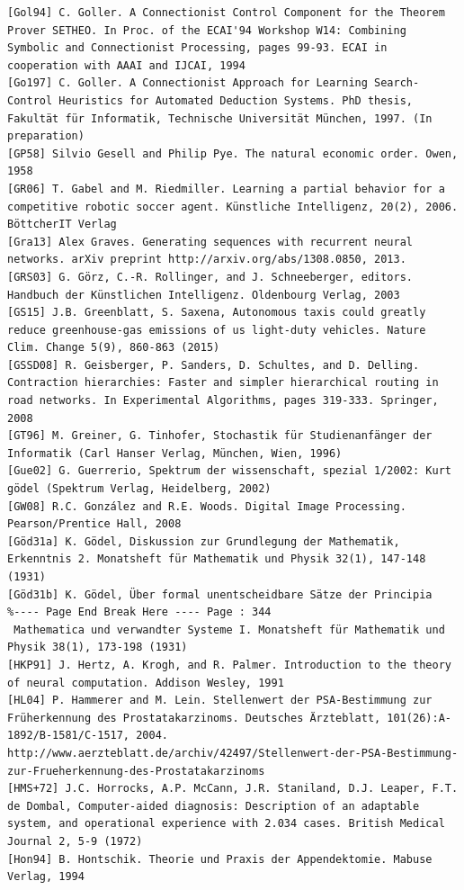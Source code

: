 \documentclass[10pt]{article}
\begin{document}
\begin{verbatim}
[Gol94] C. Goller. A Connectionist Control Component for the Theorem Prover SETHEO. In Proc. of the ECAI'94 Workshop W14: Combining Symbolic and Connectionist Processing, pages 99-93. ECAI in cooperation with AAAI and IJCAI, 1994
[Go197] C. Goller. A Connectionist Approach for Learning Search-Control Heuristics for Automated Deduction Systems. PhD thesis, Fakultät für Informatik, Technische Universität München, 1997. (In preparation)
[GP58] Silvio Gesell and Philip Pye. The natural economic order. Owen, 1958
[GR06] T. Gabel and M. Riedmiller. Learning a partial behavior for a competitive robotic soccer agent. Künstliche Intelligenz, 20(2), 2006. BöttcherIT Verlag
[Gra13] Alex Graves. Generating sequences with recurrent neural networks. arXiv preprint http://arxiv.org/abs/1308.0850, 2013.
[GRS03] G. Görz, C.-R. Rollinger, and J. Schneeberger, editors. Handbuch der Künstlichen Intelligenz. Oldenbourg Verlag, 2003
[GS15] J.B. Greenblatt, S. Saxena, Autonomous taxis could greatly reduce greenhouse-gas emissions of us light-duty vehicles. Nature Clim. Change 5(9), 860-863 (2015)
[GSSD08] R. Geisberger, P. Sanders, D. Schultes, and D. Delling. Contraction hierarchies: Faster and simpler hierarchical routing in road networks. In Experimental Algorithms, pages 319-333. Springer, 2008
[GT96] M. Greiner, G. Tinhofer, Stochastik für Studienanfänger der Informatik (Carl Hanser Verlag, München, Wien, 1996)
[Gue02] G. Guerrerio, Spektrum der wissenschaft, spezial 1/2002: Kurt gödel (Spektrum Verlag, Heidelberg, 2002)
[GW08] R.C. González and R.E. Woods. Digital Image Processing. Pearson/Prentice Hall, 2008
[Göd31a] K. Gödel, Diskussion zur Grundlegung der Mathematik, Erkenntnis 2. Monatsheft für Mathematik und Physik 32(1), 147-148 (1931)
[Göd31b] K. Gödel, Über formal unentscheidbare Sätze der Principia
%---- Page End Break Here ---- Page : 344
 Mathematica und verwandter Systeme I. Monatsheft für Mathematik und Physik 38(1), 173-198 (1931)
[HKP91] J. Hertz, A. Krogh, and R. Palmer. Introduction to the theory of neural computation. Addison Wesley, 1991
[HL04] P. Hammerer and M. Lein. Stellenwert der PSA-Bestimmung zur Früherkennung des Prostatakarzinoms. Deutsches Ärzteblatt, 101(26):A-1892/B-1581/C-1517, 2004. http://www.aerzteblatt.de/archiv/42497/Stellenwert-der-PSA-Bestimmung-zur-Frueherkennung-des-Prostatakarzinoms
[HMS+72] J.C. Horrocks, A.P. McCann, J.R. Staniland, D.J. Leaper, F.T. de Dombal, Computer-aided diagnosis: Description of an adaptable system, and operational experience with 2.034 cases. British Medical Journal 2, 5-9 (1972)
[Hon94] B. Hontschik. Theorie und Praxis der Appendektomie. Mabuse Verlag, 1994

\end{verbatim}
\end{document}
